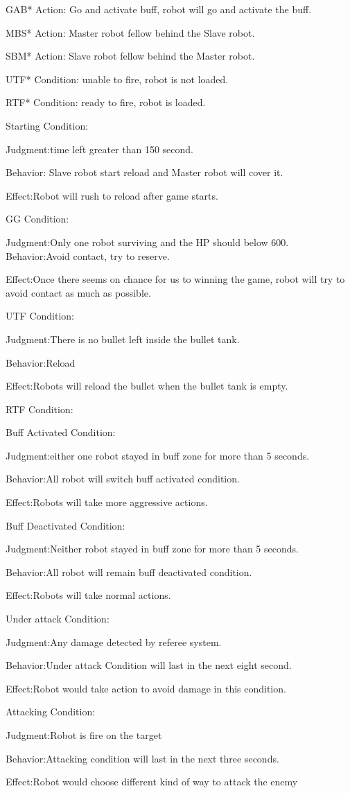 GAB* Action: Go and activate buff, robot will go and activate the buff.

MBS* Action: Master robot fellow behind the Slave robot. 

SBM* Action: Slave robot fellow behind the Master robot. 

UTF* Condition: unable to fire, robot is not loaded.

RTF* Condition: ready to fire, robot is loaded.

Starting Condition:

Judgment:time left greater than 150 second.

Behavior: Slave robot start reload and Master robot will cover it.

Effect:Robot will rush to reload after game starts.

GG Condition:

Judgment:Only one robot surviving and the HP should below 600.
Behavior:Avoid contact, try to reserve. 

Effect:Once there seems on chance for us to winning the game, robot will try to avoid contact as much as possible.

UTF Condition:

Judgment:There is no bullet left inside the bullet tank.

Behavior:Reload

Effect:Robots will reload the bullet when the bullet tank is empty. 

RTF Condition:

Buff Activated Condition:

Judgment:either one robot stayed in buff zone for more than 5 seconds.

Behavior:All robot will switch buff activated condition.

Effect:Robots will take more aggressive actions.
    
Buff Deactivated Condition:

Judgment:Neither robot stayed in buff zone for more than 5 seconds.

Behavior:All robot will remain buff deactivated condition.

Effect:Robots will take normal actions.
    
Under attack Condition:

Judgment:Any damage detected by referee system.

Behavior:Under attack Condition will last in the next eight second.

Effect:Robot would take action to avoid damage in this condition.

Attacking Condition:

Judgment:Robot is fire on the target

Behavior:Attacking condition will last in the next three seconds.

Effect:Robot would choose different kind of way to attack the enemy

\pagebreak